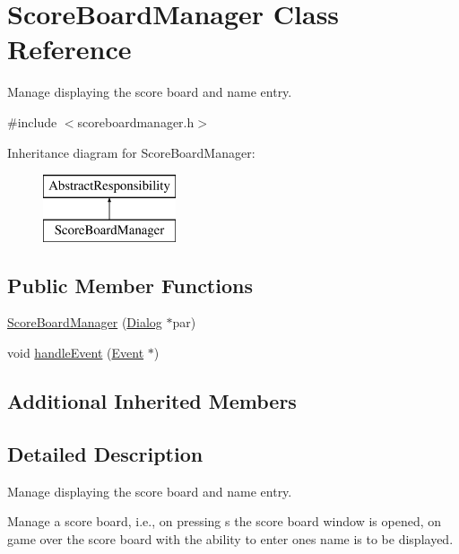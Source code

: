 \hypertarget{classScoreBoardManager}{\section{Score\-Board\-Manager Class Reference}
\label{classScoreBoardManager}
}


Manage displaying the score board and name entry.  




{\ttfamily \#include $<$scoreboardmanager.\-h$>$}

Inheritance diagram for Score\-Board\-Manager\-:\begin{figure}[H]
\begin{center}
\leavevmode
\includegraphics[height=2.000000cm]{classScoreBoardManager}
\end{center}
\end{figure}
\subsection*{Public Member Functions}
\begin{DoxyCompactItemize}
\item 
\hyperlink{classScoreBoardManager_a528501925af6d9d63186b29213af7456}{Score\-Board\-Manager} (\hyperlink{classDialog}{Dialog} $\ast$par)
\item 
void \hyperlink{classScoreBoardManager_a6dd53564ed29caaa34a043d62dbd113c}{handle\-Event} (\hyperlink{classEvent}{Event} $\ast$)
\end{DoxyCompactItemize}
\subsection*{Additional Inherited Members}


\subsection{Detailed Description}
Manage displaying the score board and name entry. 

Manage a score board, i.\-e., on pressing s the score board window is opened, on game over the score board with the ability to enter ones name is to be displayed. 

